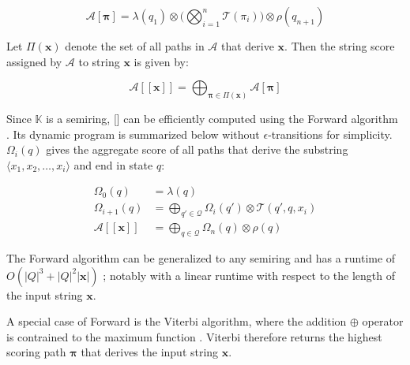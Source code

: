 \begin{equation}
  \mathcal{A}[\pmb{\pi}] = \lambda(q_1) \otimes \Bigg( \bigotimes_{i=1}^n \mathcal{T}(\pi_i) \Bigg) \otimes \rho(q_{n+1})
\end{equation}

\begin{definition}

Let $\Pi(\pmb{x})$ denote the set of all paths in $\mathcal{A}$ that derive $\pmb{x}$. Then the string score assigned by $\mathcal{A}$ to string $\pmb{x}$ is given by:
  
\end{definition}

\begin{equation}
  \mathcal{A}[\![\pmb{x}]\!] = \bigoplus_{\pmb{\pi} \in \Pi(\pmb{x})} \mathcal{A}[\pmb{\pi}]
\end{equation}

\begin{remark}
  Since $\mathbb{K}$ is a semiring, [\![\pmb{x}]\!] can be efficiently computed using the Forward algorithm \citep{baum1966statistical}. Its dynamic program is summarized below without $\epsilon$-transitions for simplicity. $\Omega_i(q)$ gives the aggregate score of all paths that derive the substring $\langle x_1, x_2, \dots, x_i \rangle$ and end in state $q$:
 
\begin{subequations}
  \begin{align}
    \Omega_0(q) &= \lambda(q) \\
    \Omega_{i+1}(q) &= \bigoplus_{q' \in \mathcal{Q}} \Omega_i(q') \otimes \mathcal{T}(q',q,x_i)  \\
    \mathcal{A}[\![\pmb{x}]\!] &= \bigoplus_{q \in \mathcal{Q}} \Omega_n(q) \otimes \rho(q)
  \end{align}
\end{subequations}

\end{remark}

\begin{remark}
  The Forward algorithm can be generalized to any semiring \citep{eisner2002parameter} and has a runtime of $O(|Q|^3 + |Q|^2|\pmb{x}|)$ \citep{schwartz2018sopa}; notably with a linear runtime with respect to the length of the input string $\pmb{x}$.
\end{remark}

\begin{remark}
  A special case of Forward is the Viterbi algorithm, where the addition $\oplus$ operator is contrained to the maximum function \citep{viterbi1967error}. Viterbi therefore returns the highest scoring path $\pmb{\pi}$ that derives the input string $\pmb{x}$.
\end{remark}

